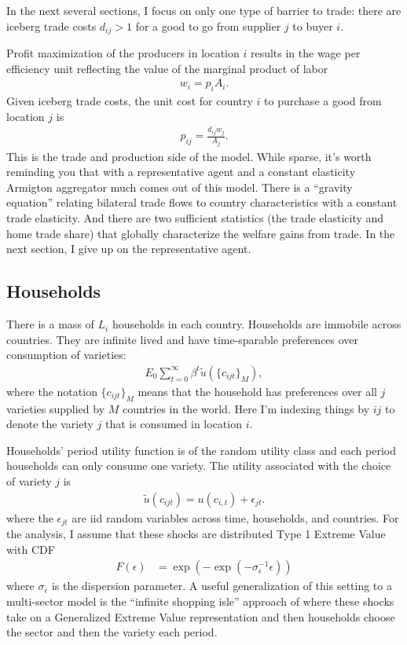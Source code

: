 \documentclass[12pt,pdftex]{article}
\begin{document}
\begin{onehalfspacing}
In the next several sections, I focus on only one type of barrier to trade: there are iceberg trade costs $d_{ij} > 1$ for a good to go from supplier $j$ to buyer $i$.

Profit maximization of the producers in location $i$ results in the wage per efficiency unit reflecting the value of the marginal product of labor
\begin{align}
w_{i} = p_{i} A_{i}.
\label{eq:marginal-product}
\end{align}
Given iceberg trade costs, the unit cost for country $i$ to purchase a good from location $j$ is
\begin{align}
p_{ij} = \frac{d_{ij}w_{j}}{A_{j}}.
\label{eq:marginal-product-ship}
\end{align}
This is the trade and production side of the model. While sparse, it's worth reminding you that with a representative agent and a constant elasticity Armigton aggregator much comes out of this model. There is a ``gravity equation'' relating bilateral trade flows to country characteristics with a constant trade elasticity. And there are two sufficient statistics (the trade elasticity and home trade share) that globally characterize the welfare gains from trade. In the next section, I give up on the representative agent.

\subsection{Households}

There is a mass of $L_i$ households in each country. Households are immobile across countries. They are infinite lived and have time-sparable preferences over consumption of varieties:
\begin{align}
E_{0} \sum_{t = 0}^{\infty} \beta^{t} \tilde{u}( \{ c_{ijt} \}_{M}),
\end{align}
where the notation $\{ c_{ijt} \}_{M}$ means that the household has preferences over all $j$ varieties supplied by $M$ countries in the world. Here I'm indexing things by $ij$ to denote the variety $j$ that is consumed in location $i$.

Households' period utility function is of the random utility class and each period households can only consume one variety. The utility associated with the choice of variety $j$ is
\begin{align}
\tilde{u}( c_{ijt} ) =  u(c_{i,t}) + \epsilon_{jt}. \label{eq:utility}
\end{align}
where the $\epsilon_{jt}$ are iid random variables across time, households, and countries. For the analysis, I assume that these shocks are distributed Type 1 Extreme Value with CDF
\begin{align}
F(\epsilon) &= \exp(-\exp(-\sigma_{\epsilon}^{-1}\epsilon))
\end{align}
where $\sigma_{\epsilon}$ is the dispersion parameter. A useful generalization of this setting to a multi-sector model is the ``infinite shopping isle'' approach of \citet{p-iq} where these shocks take on a Generalized Extreme Value representation and then households choose the sector and then the variety each period.


\end{onehalfspacing}
\end{document}
